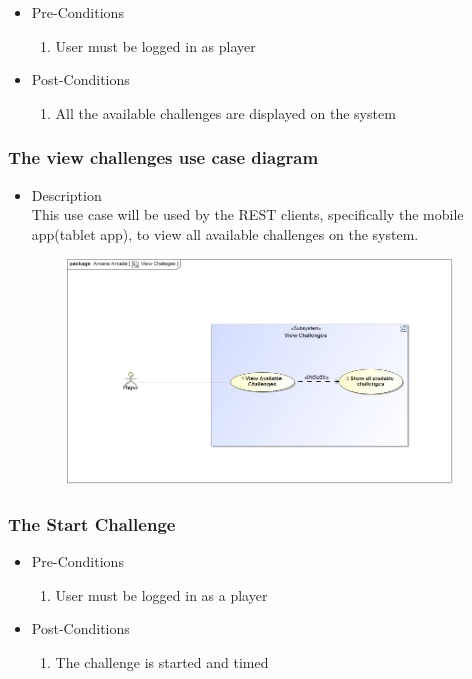 \documentclass[english]{article}
\begin{document}
			\begin{itemize}
	
		
		\item Pre-Conditions
			\begin{enumerate}
				\item User must be logged in as player
				
			\end{enumerate}
		\item Post-Conditions
			\begin{enumerate}
			\item All the available challenges are displayed on the system
						
			\end{enumerate}
	

		\end{itemize}
		
		
		\subsubsection* {The view challenges use case diagram}
		\begin{itemize}
			\item Description\\
			This use case will be used by the REST clients, specifically the mobile app(tablet app), to view all available challenges on the system.
		\end{itemize}
		
	
		\includegraphics[width=14cm,height=6cm,keepaspectratio]{viewChallenge.jpg}
		
		\subsubsection{The Start Challenge}
		
			\begin{itemize}
	
		
		\item Pre-Conditions
			\begin{enumerate}
				
				\item User must be logged in as a player
			\end{enumerate}
		\item Post-Conditions 
			\begin{enumerate}
			\item The challenge is started and timed
						
			\end{enumerate}
	

		\end{itemize}
		
\end{document}
